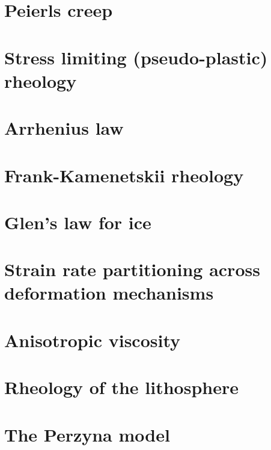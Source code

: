 \section{Peierls creep}


\section{Stress limiting (pseudo-plastic) rheology}


\section{Arrhenius law} 


\section{Frank-Kamenetskii rheology}


\section{Glen's law for ice}\label{ss:glen}


\section{Strain rate partitioning across deformation mechanisms}\label{ss:srpart}


\section{Anisotropic viscosity}


\section{Rheology of the lithosphere}


\newpage
\section{The Perzyna model}\label{sec:perzyna}













